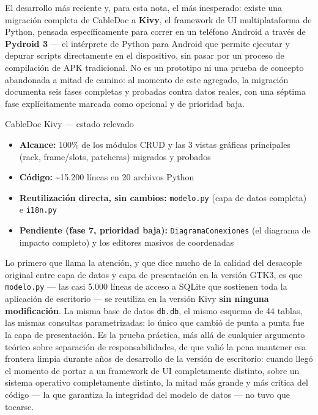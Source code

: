 \documentclass[11pt,twocolumn]{article}
\begin{document}
El desarrollo más reciente y, para esta nota, el más inesperado: existe una migración completa de CableDoc a \textbf{Kivy}, el framework de UI multiplataforma de Python, pensada específicamente para correr en un teléfono Android a través de \textbf{Pydroid 3} --- el intérprete de Python para Android que permite ejecutar y depurar scripts directamente en el dispositivo, sin pasar por un proceso de compilación de APK tradicional. No es un prototipo ni una prueba de concepto abandonada a mitad de camino: al momento de este agregado, la migración documenta seis fases completas y probadas contra datos reales, con una séptima fase explícitamente marcada como opcional y de prioridad baja.

\begin{specbox}{CableDoc Kivy --- estado relevado}
\begin{itemize}[leftmargin=1.1em,itemsep=2pt,topsep=2pt]
\item \textbf{Alcance:} 100\% de los módulos CRUD y las 3 vistas gráficas principales (rack, frame/slots, patcheras) migrados y probados
\item \textbf{Código:} \textasciitilde15.200 líneas en 20 archivos Python
\item \textbf{Reutilización directa, sin cambios:} \texttt{modelo.py} (capa de datos completa) e \texttt{i18n.py}
\item \textbf{Pendiente (fase 7, prioridad baja):} \texttt{DiagramaConexiones} (el diagrama de impacto completo) y los editores masivos de coordenadas
\end{itemize}
\end{specbox}

Lo primero que llama la atención, y que dice mucho de la calidad del desacople original entre capa de datos y capa de presentación en la versión GTK3, es que \texttt{modelo.py} --- las casi 5.000 líneas de acceso a SQLite que sostienen toda la aplicación de escritorio --- se reutiliza en la versión Kivy \textbf{sin ninguna modificación}. La misma base de datos \texttt{db.db}, el mismo esquema de 44 tablas, las mismas consultas parametrizadas: lo único que cambió de punta a punta fue la capa de presentación. Es la prueba práctica, más allá de cualquier argumento teórico sobre separación de responsabilidades, de que valió la pena mantener esa frontera limpia durante años de desarrollo de la versión de escritorio: cuando llegó el momento de portar a un framework de UI completamente distinto, sobre un sistema operativo completamente distinto, la mitad más grande y más crítica del código --- la que garantiza la integridad del modelo de datos --- no tuvo que tocarse.
\end{document}

